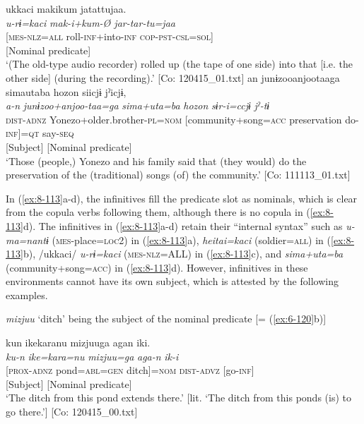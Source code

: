 \ex
{\TM}
\glll  ukkaci  makikum  jatattujaa.\\
\textit{u-rɨ=kaci}  \textit{mak-i+kum-Ø  jar-tar-tu=jaa}\\
{}[\textsc{mes}-\textsc{nlz}=\textsc{all}  roll-\textsc{inf}+into-\textsc{inf}  \textsc{cop}-\textsc{pst}-\textsc{csl}=\textsc{sol}]\\
     {}[Nominal predicate]\\
\glt ‘(The old-type audio recorder) rolled up (the tape of one side) into that [i.e. the other side] (during the recording).’ [Co: 120415\_01.txt]
\ex
{\TM}
\glll  an  junɨzooanjootaaga  simautaba     {\textbar}hozon{\textbar}  siicjɨ  jˀicjɨ,\\
\textit{a-n}  \textit{junɨzoo+anjoo-taa=ga}  \textit{sima+uta=ba}      \textit{hozon}  \textit{sɨr-i=ccjɨ}  \textit{jˀ-tɨ}\\
\textsc{dist}-\textsc{adnz}  Yonezo+older.brother-\textsc{pl}=\textsc{nom}  [community+song=\textsc{acc}      preservation  do-\textsc{inf}]=\textsc{qt}  say-\textsc{seq}\\
      {}[Subject]  [Nominal predicate]\\
\glt ‘Those (people,) Yonezo and his family said that (they would) do the preservation of the (traditional) songs (of) the community.’ [Co: 111113\_01.txt]
\z
\z

In (\ref{ex:8-113}a-d), the infinitives fill the predicate slot as nominals, which is clear from the copula verbs following them, although there is no copula in (\ref{ex:8-113}d). The infinitives in (\ref{ex:8-113}a-d) retain their “internal syntax” \citep{Haspelmath1996} such as \textit{u-ma=nantɨ} (\textsc{mes}-place=\textsc{loc}2) in (\ref{ex:8-113}a), \textit{heitai=kaci} (soldier=\textsc{all}) in (\ref{ex:8-113}b), /ukkaci/ \textit{u-rɨ=kaci} (\textsc{mes}-\textsc{nlz}=ALL) in (\ref{ex:8-113}c), and \textit{sima+uta=ba} (community+song=\textsc{acc}) in (\ref{ex:8-113}d). However, infinitives in these environments cannot have its own subject, which is attested by the following examples.

\ea\label{ex:8-114}
\ea \textit{mizjuu} ‘ditch’ being the subject of the nominal predicate [= (\ref{ex:6-120}b)]

  {\TM}
\glll  kun  {\textbar}ike{\textbar}karanu  mizjuuga  agan  iki.\\
\textit{ku-n}  \textit{ike=kara=nu}  \textit{mizjuu=ga}  \textit{aga-n}  \textit{ik-i}\\
    {}[\textsc{prox}-\textsc{adnz}  pond=\textsc{abl}=\textsc{gen}  ditch]=\textsc{nom}  \textsc{dist}-\textsc{advz}  [go-\textsc{inf}]\\
    {}[Subject]    [Nominal predicate]\\
\glt ‘The ditch from this pond extends there.’ [lit. ‘The ditch from this ponds (is) to go there.’]
    [Co: 120415\_00.txt]

